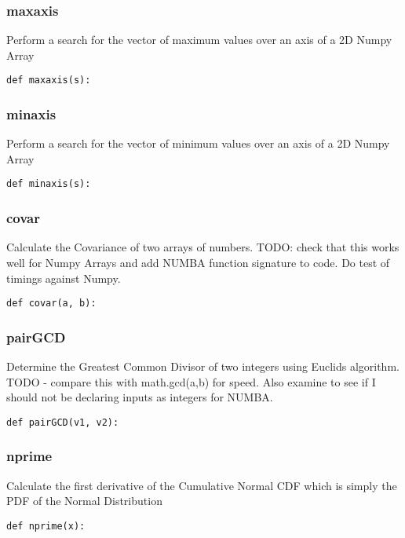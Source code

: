 \documentclass[twoside,11pt]{book}
\begin{document}
\subsubsection*{{\bf maxaxis}}
Perform a search for the vector of maximum values over an axis of a 2D Numpy Array  

\begin{lstlisting}
def maxaxis(s):
\end{lstlisting}

\subsubsection*{{\bf minaxis}}
Perform a search for the vector of minimum values over an axis of a 2D Numpy Array  

\begin{lstlisting}
def minaxis(s):
\end{lstlisting}

\subsubsection*{{\bf covar}}
Calculate the Covariance of two arrays of numbers. TODO: check that this works well for Numpy Arrays and add NUMBA function signature to code. Do test of timings against Numpy.  

\begin{lstlisting}
def covar(a, b):
\end{lstlisting}

\subsubsection*{{\bf pairGCD}}
Determine the Greatest Common Divisor of two integers using Euclids algorithm. TODO - compare this with math.gcd(a,b) for speed. Also examine to see if I should not be declaring inputs as integers for NUMBA.  

\begin{lstlisting}
def pairGCD(v1, v2):
\end{lstlisting}

\subsubsection*{{\bf nprime}}
Calculate the first derivative of the Cumulative Normal CDF which is simply the PDF of the Normal Distribution  

\begin{lstlisting}
def nprime(x):
\end{lstlisting}
\end{document}

